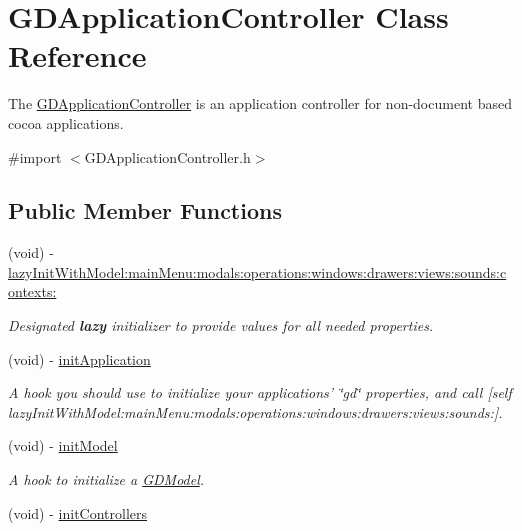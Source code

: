 \hypertarget{interface_g_d_application_controller}{
\section{GDApplicationController Class Reference}
\label{interface_g_d_application_controller}
}


The \hyperlink{interface_g_d_application_controller}{GDApplicationController} is an application controller for non-\/document based cocoa applications.  


{\ttfamily \#import $<$GDApplicationController.h$>$}\subsection*{Public Member Functions}
\begin{DoxyCompactItemize}
\item 
(void) -\/ \hyperlink{interface_g_d_application_controller_a2cbdfaa697915ca8b6ff10badce9d978}{lazyInitWithModel:mainMenu:modals:operations:windows:drawers:views:sounds:contexts:}
\begin{DoxyCompactList}\small\item\em Designated {\bfseries lazy} initializer to provide values for all needed properties. \item\end{DoxyCompactList}\item 
(void) -\/ \hyperlink{interface_g_d_application_controller_aa052dc548b3c87861b1c4b0ccd4eb44e}{initApplication}
\begin{DoxyCompactList}\small\item\em A hook you should use to initialize your applications' \char`\"{}gd\char`\"{} properties, and call \mbox{[}self lazyInitWithModel:mainMenu:modals:operations:windows:drawers:views:sounds:\mbox{]}. \item\end{DoxyCompactList}\item 
(void) -\/ \hyperlink{interface_g_d_application_controller_aeb11e53b580e91da5d776b4adc4523a3}{initModel}
\begin{DoxyCompactList}\small\item\em A hook to initialize a \hyperlink{interface_g_d_model}{GDModel}. \item\end{DoxyCompactList}\item 
\hypertarget{interface_g_d_application_controller_a5f47fab7f969d31ff7ea9556e2420b79}{
(void) -\/ \hyperlink{interface_g_d_application_controller_a5f47fab7f969d31ff7ea9556e2420b79}{initControllers}}
\label{interface_g_d_application_controller_a5f47fab7f969d31ff7ea9556e2420b79}


\end{DoxyCompactItemize}
